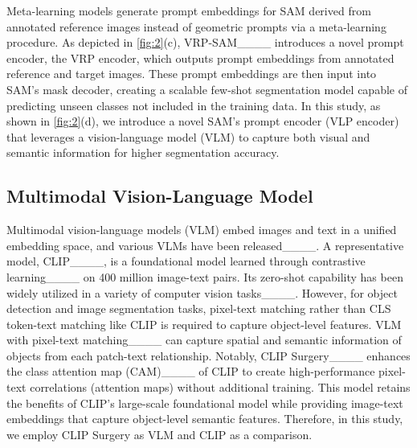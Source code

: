 Meta-learning models generate prompt embeddings for SAM derived from annotated reference images instead of geometric prompts via a meta-learning procedure. As depicted in \cref{fig:2}(c), VRP-SAM____ introduces a novel prompt encoder, the VRP encoder, which outputs prompt embeddings from annotated reference and target images. These prompt embeddings are then input into SAM's mask decoder, creating a scalable few-shot segmentation model capable of predicting unseen classes not included in the training data. In this study, as shown in \cref{fig:2}(d), we introduce a novel SAM's prompt encoder (VLP encoder) that leverages a vision-language model (VLM) to capture both visual and semantic information for higher segmentation accuracy.

\subsection{Multimodal Vision-Language Model}
Multimodal vision-language models (VLM) embed images and text in a unified embedding space, and various VLMs have been released____. A representative model, CLIP____, is a foundational model learned through contrastive learning____ on 400 million image-text pairs. Its zero-shot capability has been widely utilized in a variety of computer vision tasks____. However, for object detection and image segmentation tasks, pixel-text matching rather than CLS token-text matching like CLIP is required to capture object-level features. VLM with pixel-text matching____ can capture spatial and semantic information of objects from each patch-text relationship. Notably, CLIP Surgery____ enhances the class attention map (CAM)____ of CLIP to create high-performance pixel-text correlations (attention maps) without additional training. This model retains the benefits of CLIP's large-scale foundational model while providing image-text embeddings that capture object-level semantic features. Therefore, in this study, we employ CLIP Surgery as VLM and CLIP as a comparison.

